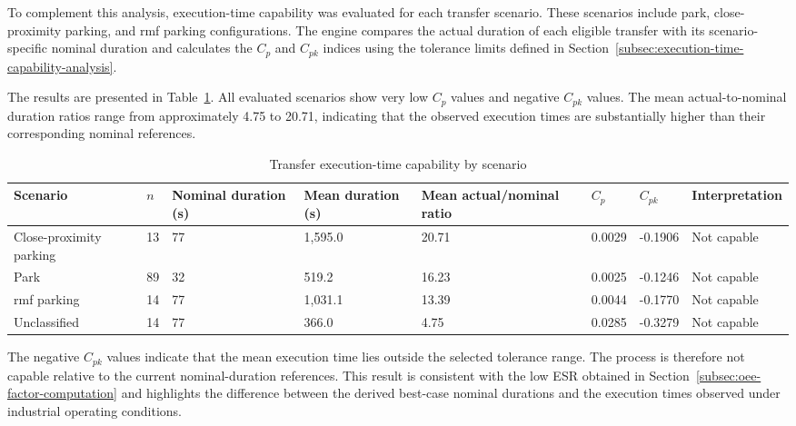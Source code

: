 To complement this analysis, execution-time capability was evaluated for each transfer scenario. These scenarios include park, close-proximity parking, and \gls{rmf} parking configurations. The engine compares the actual duration of each eligible transfer with its scenario-specific nominal duration and calculates the $C_p$ and $C_{pk}$ indices using the tolerance limits defined in Section~\ref{subsec:execution-time-capability-analysis}.

The results are presented in Table~\ref{tab:transfer-execution-time-capability-by-scenario}. All evaluated scenarios show very low $C_p$ values and negative $C_{pk}$ values. The mean actual-to-nominal duration ratios range from approximately 4.75 to 20.71, indicating that the observed execution times are substantially higher than their corresponding nominal references.

\begin{table}[H]
\small
\renewcommand{\arraystretch}{1.3}
\centering
\caption{Transfer execution-time capability by scenario}
\label{tab:transfer-execution-time-capability-by-scenario}
\begin{adjustbox}{max width=\textwidth}
\begin{tabular}{|p{3.2cm}|p{0.8cm}|p{1.8cm}|p{1.9cm}|p{2.3cm}|p{1.3cm}|p{1.5cm}|p{2.6cm}|}
\hline
\textbf{Scenario} & \textbf{$n$} & \textbf{Nominal duration (s)} & \textbf{Mean duration (s)} & \textbf{Mean actual/nominal ratio} & \textbf{$C_p$} & \textbf{$C_{pk}$} & \textbf{Interpretation} \\
\hline
Close-proximity parking & 13 & 77 & 1,595.0 & 20.71 & 0.0029 & -0.1906 & Not capable \\
\hline
Park & 89 & 32 & 519.2 & 16.23 & 0.0025 & -0.1246 & Not capable \\
\hline
\acrshort{rmf} parking & 14 & 77 & 1,031.1 & 13.39 & 0.0044 & -0.1770 & Not capable \\
\hline
Unclassified & 14 & 77 & 366.0 & 4.75 & 0.0285 & -0.3279 & Not capable \\
\hline
\end{tabular}
\end{adjustbox}
\end{table}

The negative $C_{pk}$ values indicate that the mean execution time lies outside the selected tolerance range. The process is therefore not capable relative to the current nominal-duration references. This result is consistent with the low ESR obtained in Section~\ref{subsec:oee-factor-computation} and highlights the difference between the derived best-case nominal durations and the execution times observed under industrial operating conditions.


